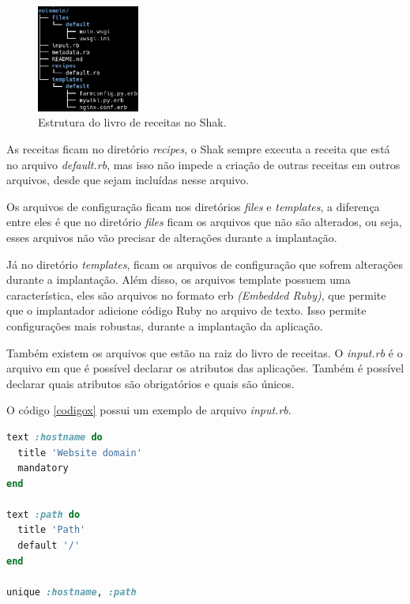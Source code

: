 \begin{figure}[H]
  \centering
  \includegraphics[width=0.3\textwidth]
      {figuras/cookbook}
      \caption{Estrutura do livro de receitas no Shak.}
  \label{fig:x}
\end{figure}

As receitas ficam no diretório \textit{recipes}, o Shak sempre executa a receita que está
no arquivo \textit{default.rb}, mas isso não impede a criação de outras receitas em outros arquivos,
desde que sejam incluídas nesse arquivo. 

Os arquivos de configuração ficam nos diretórios \textit{files} e \textit{templates},
a diferença entre eles é que no diretório \textit{files} ficam os arquivos que
não são alterados, ou seja, esses arquivos não vão precisar de alterações
durante a implantação. 

Já no diretório \textit{templates}, ficam os arquivos de configuração que sofrem alterações durante 
a implantação. Além disso, os arquivos template possuem uma característica, eles 
são arquivos no formato erb \textit{(Embedded Ruby)}, que permite que o 
implantador adicione código Ruby no arquivo de texto. Isso permite configurações
mais robustas, durante a implantação da aplicação.

Também existem os arquivos que estão na raiz do livro de receitas. O \textit{input.rb}
é o arquivo em que é possível declarar os atributos das aplicações. Também é 
possível declarar quais atributos são obrigatórios e quais são únicos.

O código \ref{codigox} possui um exemplo de arquivo \textit{input.rb}.

\begin{lstlisting}[basicstyle=\ttfamily, language=Ruby,label=dice_index,caption={Exemplo de código no arquivo input.rb}, label=codigox]
text :hostname do
  title 'Website domain'                                                        
  mandatory                                                                     
end                                                                             
                                                                                
text :path do                                                                   
  title 'Path'                                                                  
  default '/'                                                                   
end                                                                             
                                                                                
unique :hostname, :path 
\end{lstlisting}

